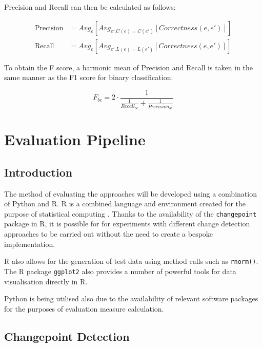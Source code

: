 \documentclass{uvamscse}	%
\begin{document}
\begin{description}
	Precision and Recall can then be calculated as follows:
	
    \begin{align}
    \label{eqn:bcubed-precision}
        \text{Precision} &= Avg_e [Avg_{e' . C(e) = C(e')}[Correctness(e,e')]]\\
        \label{eqn:bcubed-recall}
        \text{Recall} &= Avg_e [Avg_{e' . L(e) = L(e')}[Correctness(e,e')]]
    \end{align}

To obtain the F score, a harmonic mean of Precision and Recall is taken in the same manner as the F1 score for binary classification:

\begin{equation}
    F_{bc} = 2 \cdot \frac{1}{\frac{1}{Recall_{bc}} + \frac{1}{Precision_{bc}}}
\end{equation}

\end{description}

\section{Evaluation Pipeline}

\subsection{Introduction}

The method of evaluating the approaches will be developed using a combination of Python and \textsf{R}. \textsf{R} is a combined language and environment created for the purpose of statistical computing \cite{RCoreTeam2017}. Thanks to the availability of the \texttt{changepoint} package in \textsf{R}\cite{Killick2014}, it is possible for for experiments with different change detection approaches to be carried out without the need to create a bespoke implementation.

\textsf{R} also allows for the generation of test data using method calls such as \texttt{rnorm()}. The \textsf{R} package \texttt{ggplot2} \cite{Wickham2009} also provides a number of powerful tools for data visualisation directly in \textsf{R}.

Python is being utilised also due to the availability of relevant software packages for the purposes of evaluation measure calculation.

\subsection{Changepoint Detection}
\end{document}

